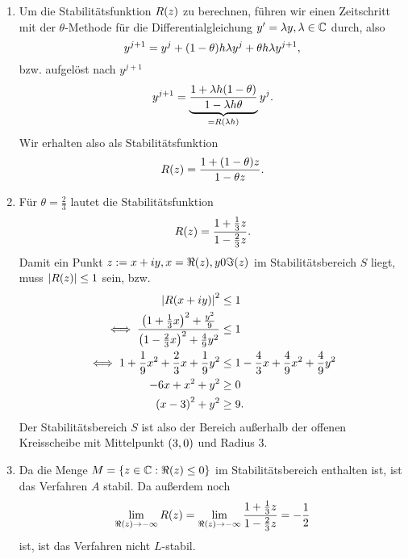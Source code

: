 \documentclass{exercise}
\begin{document}
	\begin{enumerate}
		\item Um die Stabilitätsfunktion \(R\parentheses*{z}\) zu berechnen, führen wir einen Zeitschritt mit der \(\theta\)-Methode für die Differentialgleichung \(y' = \lambda y, \lambda \in \C\) durch, also
		\[
			y^{j + 1} = y^j + \parentheses*{1 - \theta}h\lambda y^j + \theta h\lambda y^{j + 1},
		\]
		bzw. aufgelöst nach \(y^{j + 1}\)
		\[
			y^{j + 1} = \underbrace{\frac{1 + \lambda h\parentheses*{1 - \theta}}{1 - \lambda h\theta}}_{= R\parentheses*{\lambda h}}y^j.
		\]
		Wir erhalten also als Stabilitätsfunktion
		\[
			R\parentheses*{z} = \frac{1 + \parentheses*{1 - \theta}z}{1 - \theta z}.
		\]
		\item Für \(\theta = \frac{2}{3}\) lautet die Stabilitätsfunktion
		\[
			R\parentheses*{z} = \frac{1 + \frac{1}{3}z}{1 - \frac{2}{3}z}.
		\]
		Damit ein Punkt \(z := x + iy, x = \Re\parentheses*{z}, y 0 \Im\parentheses*{z}\) im Stabilitätsbereich \(S\) liegt, muss \(\absolute*{R\parentheses*{z}} \le 1\) sein, bzw.
		\begin{align*}
			\absolute*{R\parentheses*{x + iy}}^2 &\le 1\\
			\iff \frac{\parentheses*{1 + \frac{1}{3}x}^2 + \frac{y^2}{9}}{\parentheses*{1 - \frac{2}{3}x}^2 + \frac{4}{9}y^2} &\le 1\\
			\iff 1 + \frac{1}{9}x^2 + \frac{2}{3}x + \frac{1}{9}y^2 &\le 1 - \frac{4}{3}x + \frac{4}{9}x^2 + \frac{4}{9}y^2\\
			-6x + x^2 + y^2 &\ge 0\\
			\parentheses*{x - 3}^2 + y^2 &\ge 9.
		\end{align*}
		Der Stabilitätsbereich \(S\) ist also der Bereich außerhalb der offenen Kreisscheibe mit Mittelpunkt \(\parentheses*{3, 0}\) und Radius \(3\).
		\item Da die Menge \(M = \braces*{z \in \C : \Re\parentheses*{z} \le 0}\) im Stabilitätsbereich enthalten ist, ist das Verfahren \(A\) stabil.
		Da außerdem noch
		\[
			\lim_{\Re\parentheses*{z} \to -\infty}R\parentheses*{z} = \lim_{\Re\parentheses*{z} \to -\infty}\frac{1 + \frac{1}{3}z}{1 - \frac{2}{3}z} = -\frac{1}{2}
		\]
		ist, ist das Verfahren nicht \(L\)-stabil.
	\end{enumerate}


	\section{}
\end{document}
